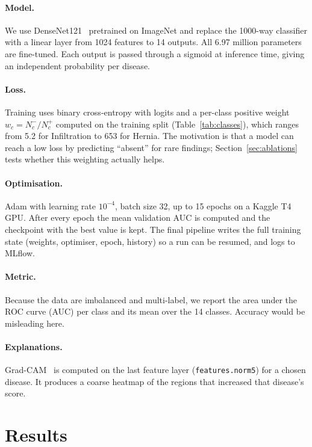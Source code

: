 \documentclass[11pt,a4paper]{article}
\begin{document}
\paragraph{Model.} We use DenseNet121~\cite{huang2017densenet} pretrained on ImageNet and replace the 1000-way classifier with a linear layer from 1024 features to 14 outputs. All 6.97 million parameters are fine-tuned. Each output is passed through a sigmoid at inference time, giving an independent probability per disease.

\paragraph{Loss.} Training uses binary cross-entropy with logits and a per-class positive weight $w_c = N^{-}_c / N^{+}_c$ computed on the training split (Table~\ref{tab:classes}), which ranges from 5.2 for Infiltration to 653 for Hernia. The motivation is that a model can reach a low loss by predicting ``absent'' for rare findings; Section~\ref{sec:ablations} tests whether this weighting actually helps.

\paragraph{Optimisation.} Adam with learning rate $10^{-4}$, batch size 32, up to 15 epochs on a Kaggle T4 GPU. After every epoch the mean validation AUC is computed and the checkpoint with the best value is kept. The final pipeline writes the full training state (weights, optimiser, epoch, history) so a run can be resumed, and logs to MLflow.

\paragraph{Metric.} Because the data are imbalanced and multi-label, we report the area under the ROC curve (AUC) per class and its mean over the 14 classes. Accuracy would be misleading here.

\paragraph{Explanations.} Grad-CAM~\cite{selvaraju2017gradcam} is computed on the last feature layer (\texttt{features.norm5}) for a chosen disease. It produces a coarse heatmap of the regions that increased that disease's score.

\section{Results}
\end{document}
